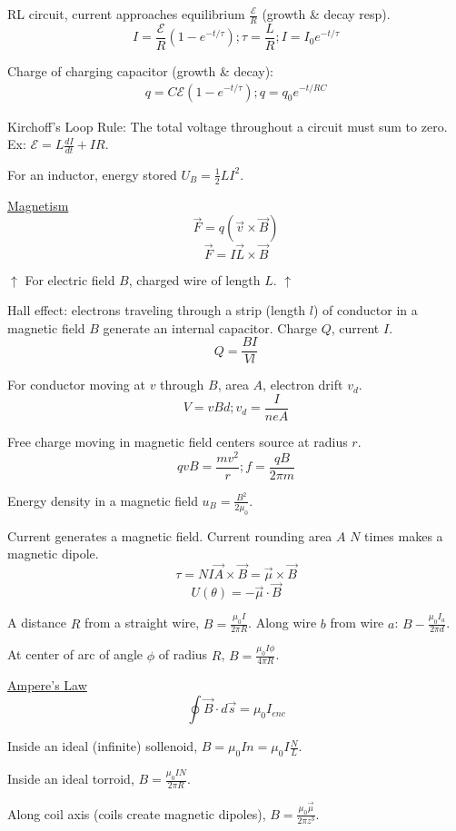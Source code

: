 \documentclass[8pt]{minimal}
\begin{document}
RL circuit, current approaches equilibrium $\frac{\mathcal{E}}{R}$ (growth \& decay resp).
\[ I = \frac{\mathcal{E}}{R}(1 - e^{-t/\tau}); \tau = \frac{L}{R}; I = I_0 e^{-t/\tau} \]

Charge of charging capacitor (growth \& decay):
\begin{gather*}
    q = C\mathcal{E}(1 - e^{-t/\tau}); q = q_0 e^{-t/RC}
\end{gather*}

Kirchoff's Loop Rule: The total voltage throughout a circuit must sum to zero.
Ex: $\mathcal{E} = L\frac{dI}{dt} + IR$.

For an inductor, energy stored $U_B = \frac{1}{2}LI^2$.

\underline{Magnetism}
\[ \vec{F} = q(\vec{v} \times \vec{B}) \]
\[ \vec{F} = I\vec{L} \times \vec{B} \]

$\uparrow$ For electric field $B$, charged wire of length $L$. $\uparrow$

Hall effect: electrons traveling through a strip (length $l$) of conductor in a magnetic field $B$ generate an internal capacitor.
Charge $Q$, current $I$.
\[ Q = \frac{BI}{Vl} \]

For conductor moving at $v$ through $B$, area $A$, electron drift $v_d$.
\[ V = vBd; v_d = \frac{I}{neA} \]

Free charge moving in magnetic field centers source at radius $r$.
\[ qvB = \frac{mv^2}{r}; f = \frac{qB}{2\pi m} \]

Energy density in a magnetic field $u_B = \frac{B^2}{2\mu_0}$.

Current generates a magnetic field.
Current rounding area $A$ $N$ times makes a magnetic dipole.
\[ \tau = NI \vec{A} \times \vec{B} = \vec{\mu} \times \vec{B} \]
\[ U(\theta) = -\vec{\mu} \cdot \vec{B} \]

A distance $R$ from a straight wire, $B = \frac{\mu_0 I}{2\pi R}$.
Along wire $b$ from wire $a$: $B - \frac{\mu_0 I_a}{2\pi d}$.

At center of arc of angle $\phi$ of radius $R$, $B = \frac{\mu_0 I \phi}{4\pi R}$.

\underline{Ampere's Law}
\[ \oint \vec{B} \cdot d\vec{s} = \mu_0 I_{enc} \]

Inside an ideal (infinite) sollenoid, $B = \mu_0 In = \mu_0 I\frac{N}{L}$.

Inside an ideal torroid, $B = \frac{\mu_0 IN}{2\pi R}$.

Along coil axis (coils create magnetic dipoles), $B = \frac{\mu_0 \vec{\mu}}{2\pi z^3}$.
\end{document}
